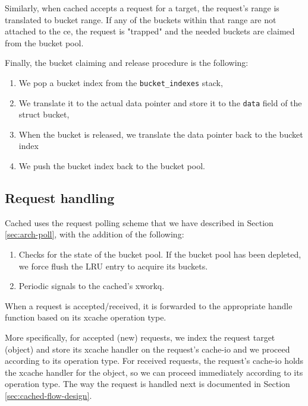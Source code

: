 Similarly, when cached accepts a request for a target, the request's range is 
translated to bucket range. If any of the buckets within that range are not 
attached to the ce, the request is "trapped" and the needed buckets are claimed 
from the bucket pool.

Finally, the bucket claiming and release procedure is the following:
\begin{enumerate}
\item We pop a bucket index from the \texttt{bucket\_indexes} stack,
\item We translate it to the actual data pointer and store it to the 
	\texttt{data} field of the struct bucket,
\item When the bucket is released, we translate the data pointer back to the 
	bucket index
\item We push the bucket index back to the bucket pool.
\end{enumerate}

\subsection{Request handling}

Cached uses the request polling scheme that we have described in Section 
\ref{sec:arch-poll}, with the addition of the following:

\begin{enumerate}
	\item Checks for the state of the bucket pool. If the bucket pool has 
		been depleted, we force flush the LRU entry to acquire its 
		buckets.
	\item Periodic signals to the cached's xworkq.
\end{enumerate}

When a request is accepted/received, it is forwarded to the appropriate handle 
function based on its xcache operation type.

More specifically, for accepted (new) requests, we index the request target 
(object) and store its xcache handler on the request's cache-io and we proceed 
according to its operation type. For received requests, the request's cache-io 
holds the xcache handler for the object, so we can proceed immediately 
according to its operation type. The way the request is handled next is 
documented in Section \ref{sec:cached-flow-design}.

